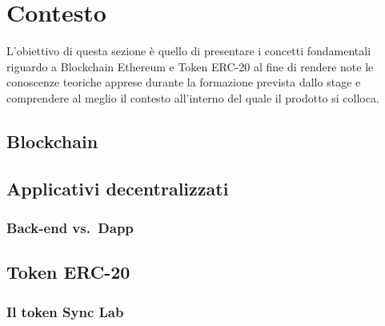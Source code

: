 
\chapter{Contesto}
\label{cap:contesto}
L’obiettivo di questa sezione è quello di presentare i concetti fondamentali riguardo a Blockchain Ethereum e Token ERC-20 al fine di rendere note le conoscenze teoriche apprese durante la formazione prevista dallo stage e comprendere al meglio il contesto all'interno del quale il prodotto si colloca.

\section{Blockchain}

\section{Applicativi decentralizzati}
    \subsection{Back-end vs.\ Dapp}

\section{Token ERC-20}
    \subsection{Il token Sync Lab}